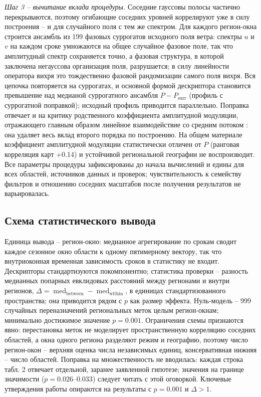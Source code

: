 \documentclass[12pt,a4paper]{article}
\newcommand{\Psurr}{P_{\mathrm{surr}}}
\begin{document}
\emph{Шаг 3 -- вычитание вклада процедуры.} Соседние гауссовы полосы частично перекрываются, поэтому огибающие соседних уровней коррелируют уже в силу построения -- и для случайного поля с тем же спектром. Для каждого регион-окна строится ансамбль из 199 фазовых суррогатов исходного поля ветра: спектры $u$ и $v$ на каждом сроке умножаются на общее случайное фазовое поле, так что амплитудный спектр сохраняется точно, а фазовая структура, в которой заключена негауссова организация поля, разрушается; в силу линейности оператора вихря это тождественно фазовой рандомизации самого поля вихря. Вся цепочка повторяется на суррогатах, и основной формой дескриптора становится превышение над медианой суррогатного ансамбля $P - \Psurr$ (профиль с суррогатной поправкой); исходный профиль приводится параллельно. Поправка отвечает и на критику родственного коэффициента амплитудной модуляции, отражающего главным образом линейное взаимодействие со средним потоком \cite{CuiJacobi2025}: она удаляет весь вклад второго порядка по построению. На общем материале коэффициент амплитудной модуляции статистически отличен от $P$ (ранговая корреляция карт +0.14) и устойчивой региональной географии не воспроизводит. Все параметры процедуры зафиксированы до начала вычислений и едины для всех областей, источников данных и проверок; чувствительность к семейству фильтров и отношению соседних масштабов после получения результатов не варьировалась.

\subsection{Схема статистического вывода}

Единица вывода -- регион-окно: медианное агрегирование по срокам сводит каждое сезонное окно области к одному пятимерному вектору, так что внутриоконная временная зависимость сроков в статистику не входит. Дескрипторы стандартизуются покомпонентно; статистика проверки -- разность медианных попарных евклидовых расстояний между регионами и внутри регионов, $\Delta = \operatorname{med}_{\mathrm{between}} - \operatorname{med}_{\mathrm{within}}$, в единицах стандартизованного пространства; она приводится рядом с $p$ как размер эффекта. Нуль-модель -- 999 случайных переназначений региональных меток целым регион-окнам; минимально достижимое значение $p = 0.001$. Ограничения схемы признаются явно: перестановка меток не моделирует пространственную корреляцию соседних областей, а окна одного региона разделяют режим и географию, поэтому число регион-окон -- верхняя оценка числа независимых единиц, консервативная нижняя -- число областей. Поправка на множественность не вводилась: каждая строка табл. 2 отвечает отдельной, заранее заявленной гипотезе; значения на границе значимости ($p = 0.026$--$0.033$) следует читать с этой оговоркой. Ключевые утверждения работы опираются на результаты с $p = 0.001$ и $\Delta > 1$.
\end{document}

